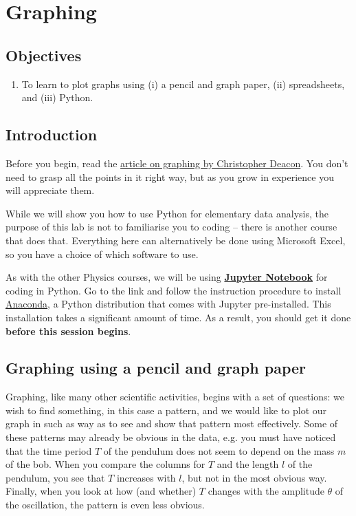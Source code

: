 
\chapter{Graphing}
\section{Objectives}

\begin{enumerate}
    \item To learn to plot graphs using (i) a pencil and graph paper, (ii) spreadsheets, and (iii) Python.
\end{enumerate}

\section{Introduction}

Before you begin, read the \href{https://drive.google.com/open?id=1ZxYayhCt-y0VdKSYUTYUvRuKX6yZgWdD}{article on graphing by Christopher Deacon}. You don't need to grasp all the points in it right way, but as you grow in experience you will appreciate them.

While we will show you how to use Python for elementary data analysis, the purpose of this lab is not to familiarise you to coding -- there is another course that does that. Everything here can alternatively be done using Microsoft Excel, so you have a choice of which software to use. 

\begin{imp}
As with the other Physics courses, we will be using \textbf{\href{https://jupyter.org}{Jupyter Notebook}} for coding in Python.  Go to the link and follow the instruction procedure to install \href{https://www.anaconda.com/downloads}{Anaconda}, a Python distribution that comes with Jupyter pre-installed. This installation takes a significant amount of time. As a result, you should get it done \textbf{before this session begins}. 
\end{imp}

\section{Graphing using a pencil and graph paper}
Graphing, like many other scientific activities, begins with a set of questions: we wish to find something, in this case a pattern, and we would like to plot our graph in such as way as to see and show that pattern most effectively. Some of these patterns may already be obvious in the data, e.g. you must have noticed that the time period $T$ of the pendulum does not seem to depend on the mass $m$ of the bob. When you compare the columns for $T$ and the length $l$ of the pendulum, you see that $T$ increases with $l$, but not in the most obvious way. Finally, when you look at how (and whether) $T$ changes with the amplitude $\theta$ of the oscillation, the pattern is even less obvious. 

